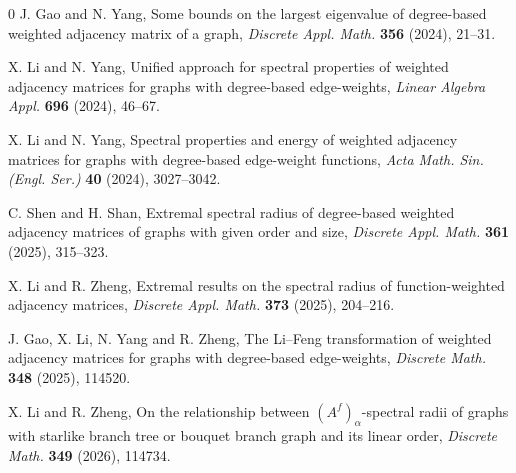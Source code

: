 \documentclass[12pt,twoside]{article}
\begin{document}
\begin{thebibliography}{0}
	J. Gao and N. Yang,
	Some bounds on the largest eigenvalue of degree-based weighted adjacency matrix of a graph,
	\emph{Discrete Appl. Math.} \textbf{356} (2024), 21--31.
	
	X. Li and N. Yang,
	Unified approach for spectral properties of weighted adjacency matrices for graphs with degree-based edge-weights,
	\emph{Linear Algebra Appl.} \textbf{696} (2024), 46--67.
	
	X. Li and N. Yang,
	Spectral properties and energy of weighted adjacency matrices for graphs with degree-based edge-weight functions,
	\emph{Acta Math. Sin. (Engl. Ser.)} \textbf{40} (2024), 3027--3042.
	
	C. Shen and H. Shan,
	Extremal spectral radius of degree-based weighted adjacency matrices of graphs with given order and size,
	\emph{Discrete Appl. Math.} \textbf{361} (2025), 315--323.
	
	X. Li and R. Zheng,
	Extremal results on the spectral radius of function-weighted adjacency matrices,
	\emph{Discrete Appl. Math.} \textbf{373} (2025), 204--216.
	
	J. Gao, X. Li, N. Yang and R. Zheng,
	The Li--Feng transformation of weighted adjacency matrices for graphs with degree-based edge-weights,
	\emph{Discrete Math.} \textbf{348} (2025), 114520.
	
	X. Li and R. Zheng,
	On the relationship between $({A}^{f})_{\alpha}$-spectral radii of graphs with starlike branch tree or bouquet branch graph and its linear order,
	\emph{Discrete Math.} \textbf{349} (2026), 114734.
	
\end{thebibliography}
\end{document}
